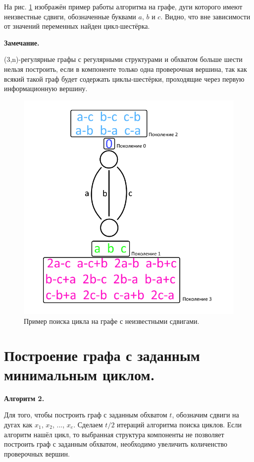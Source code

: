 \documentclass[14pt]{mmcs_article}
\begin{document}
На рис. \ref{image:5} изображён пример работы алгоритма на графе, дуги которого имеют неизвестные сдвиги, обозначенные буквами $a$, $b$ и $c$. Видно, что вне зависимости от значений переменных найден цикл-шестёрка.

\textbf{Замечание.}

(3,n)-регулярные графы с регулярными структурами и обхватом больше шести нельзя построить, если в компоненте только одна проверочная вершина, так как всякий такой граф будет содержать циклы-шестёрки, проходящие через первую информационную вершину.
 
\begin{figure}[H]
  \centering
  \includegraphics[scale=0.4]{Fig_5.png}
  \caption{ Пример поиска цикла на графе с неизвестными сдвигами. }
  \label{image:5}
\end{figure}
   
\newpage

\section{Построение графа с заданным минимальным циклом.}

\textbf{Алгоритм 2.}

Для того, чтобы построить граф с заданным обхватом $t$, обозначим сдвиги на дугах как $x_1$, $x_2$, ..., $x_e$. Сделаем $t/2$ итераций алгоритма поиска циклов. Если алгоритм нашёл цикл, то выбранная структура компоненты не позволяет построить граф с заданным обхватом, необходимо увеличить количенство проверочных вершин.
\end{document}
